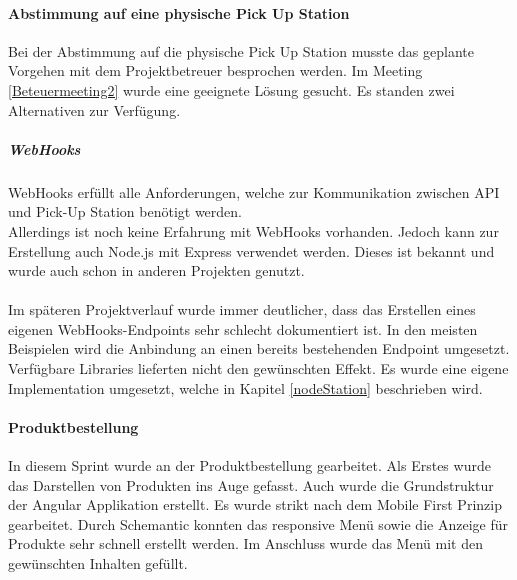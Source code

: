 \paragraph{Abstimmung auf eine physische Pick Up Station}
Bei der Abstimmung auf die physische Pick Up Station musste das geplante Vorgehen mit dem Projektbetreuer besprochen werden. Im Meeting \ref{Beteuermeeting2} wurde eine geeignete Lösung gesucht. Es standen zwei Alternativen zur Verfügung. 
\subparagraph{WebHooks}
\gls{WebHooks} erfüllt alle Anforderungen, welche zur Kommunikation zwischen API und Pick-Up Station benötigt werden. \\Allerdings ist noch keine Erfahrung mit \gls{WebHooks} vorhanden. Jedoch kann zur Erstellung auch Node.js mit Express verwendet werden. Dieses ist bekannt und wurde auch schon in anderen Projekten genutzt.\\\\
Im späteren Projektverlauf wurde immer deutlicher, dass das Erstellen eines eigenen WebHooks-Endpoints sehr schlecht dokumentiert ist. In den meisten Beispielen wird die Anbindung an einen bereits bestehenden Endpoint umgesetzt. Verfügbare Libraries lieferten nicht den gewünschten Effekt. Es wurde eine eigene Implementation umgesetzt, welche in Kapitel \ref{nodeStation} beschrieben wird. 

\paragraph{Produktbestellung}
In diesem Sprint wurde an der Produktbestellung gearbeitet. Als Erstes wurde das Darstellen von Produkten ins Auge gefasst. Auch wurde die Grundstruktur der Angular Applikation erstellt. 
Es wurde strikt nach dem Mobile First Prinzip gearbeitet. Durch Schemantic konnten das responsive Menü sowie die Anzeige für Produkte sehr schnell erstellt werden. Im Anschluss wurde das Menü mit den gewünschten Inhalten gefüllt. \\

